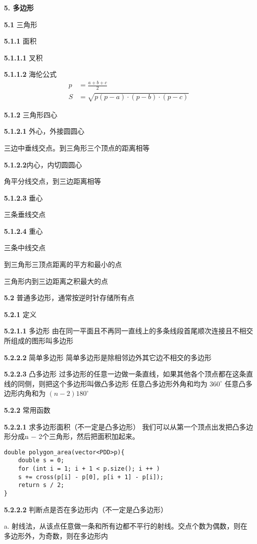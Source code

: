 \documentclass[12pt]{article}
\begin{document}
\textbf{5. 多边形}

\textbf{5.1} 三角形

\textbf{5.1.1} 面积

\textbf{5.1.1.1} 叉积

\textbf{5.1.1.2} 海伦公式
$$
\begin{aligned}
	p &= \frac{a + b + c}{2}\\
	S &= \sqrt{p(p - a)\cdot(p - b)\cdot(p - c)}
\end{aligned}
$$

\textbf{5.1.2} 三角形四心

\textbf{5.1.2.1} 外心，外接圆圆心

三边中垂线交点。到三角形三个顶点的距离相等

\textbf{5.1.2.2}内心，内切圆圆心

角平分线交点，到三边距离相等

\textbf{5.1.2.3} 垂心

三条垂线交点

\textbf{5.1.2.4} 重心

三条中线交点

到三角形三顶点距离的平方和最小的点

三角形内到三边距离之积最大的点

\textbf{5.2} 普通多边形，通常按逆时针存储所有点

\textbf{5.2.1} 定义

\textbf{5.2.1.1} 多边形
由在同一平面且不再同一直线上的多条线段首尾顺次连接且不相交所组成的图形叫多边形

\textbf{5.2.2.2} 简单多边形
简单多边形是除相邻边外其它边不相交的多边形

\textbf{5.2.2.3} 凸多边形
过多边形的任意一边做一条直线，如果其他各个顶点都在这条直线的同侧，则把这个多边形叫做凸多边形
任意凸多边形外角和均为 $360^{\circ}$
任意凸多边形内角和为 $(n−2)180^{\circ}$

\textbf{5.2.2} 常用函数

\textbf{5.2.2.1} 求多边形面积（不一定是凸多边形）
我们可以从第一个顶点出发把凸多边形分成n − 2个三角形，然后把面积加起来。

\begin{lstlisting}[style=C++]
double polygon_area(vector<PDD>p){
	double s = 0;
	for (int i = 1; i + 1 < p.size(); i ++ )
	s += cross(p[i] - p[0], p[i + 1] - p[i]);
	return s / 2;
}
\end{lstlisting}

\textbf{5.2.2.2} 判断点是否在多边形内（不一定是凸多边形）
      
a. 射线法，从该点任意做一条和所有边都不平行的射线。交点个数为偶数，则在多边形外，为奇数，则在多边形内
\end{document}
